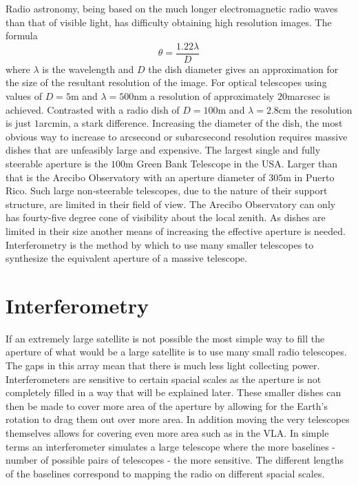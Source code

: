 Radio astronomy, being based on the much longer electromagnetic radio waves than that of visible light, has difficulty obtaining high resolution images.
The formula
\begin{equation}
\theta=\frac{1.22\lambda}{D}
\end{equation}
where $\lambda$ is the wavelength and $D$ the dish diameter gives an approximation for the size of the resultant resolution of the image\citep{wilson2009tools}.
For optical telescopes using values of $D=5$m and $\lambda=500$nm a resolution of approximately $20$marcsec is achieved.
Contrasted with a radio dish of $D=100$m and $\lambda=2.8$cm the resolution is just $1$arcmin, a stark difference.
Increasing the diameter of the dish, the most obvious way to increase to arcsecond or subarcsecond resolution requires massive dishes that are unfeasibly large and expensive.
The largest single and fully steerable aperture is the $100$m Green Bank Telescope in the USA. 
Larger than that is the Arecibo Observatory with an aperture diameter of $305$m in Puerto Rico.
Such large non-steerable telescopes, due to the nature of their support structure, are limited in their field of view.
The Arecibo Observatory can only has fourty-five degree cone of visibility about the local zenith.
As dishes are limited in their size another means of increasing the effective aperture is needed.
Interferometry is the method by which to use many smaller telescopes to synthesize the equivalent aperture of a massive telescope.

\section{Interferometry}





If an extremely large satellite is not possible the most simple way to fill the aperture of what would be a large satellite is to use many small radio telescopes\citep{wilson2009tools}.
The gaps in this array mean that there is much less light collecting power.
Interferometers are sensitive to certain spacial scales as the aperture is not completely filled in a way that will be explained later.
These smaller dishes can then be made to cover more area of the aperture by allowing for the Earth's rotation to drag them out over more area.
In addition moving the very telescopes themselves allows for covering even more area such as in the VLA\citep{VLAWashingtonPost}.
In simple terms an interferometer simulates a large telescope where the more baselines - number of possible pairs of telescopes - the more sensitive\citep{thompson1994interferometry}.
The different lengths of the baselines correspond to mapping the radio on different spacial scales\citep{thompson1994interferometry}.

